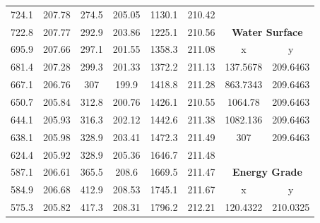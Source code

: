 \begin{center}
\begin{tabular}{|cccc||cc||cc|}
    724.1    & 207.78                   & 274.5 & 205.05                        & 1130.1 & 210.42                                &          &                                     \\
    722.8    & 207.77                   & 292.9 & 203.86                        & 1225.1 & 210.56                                & \multicolumn{2}{c|}{\textbf{Water Surface }}   \\ 
    \cline{7-8}
    695.9    & 207.66                   & 297.1 & 201.55                        & 1358.3 & 211.08                                & x        & y                                   \\
    681.4    & 207.28                   & 299.3 & 201.33                        & 1372.2 & 211.13                                & 137.5678 & 209.6463                            \\
    667.1    & 206.76                   & 307   & 199.9                         & 1418.8 & 211.28                                & 863.7343 & 209.6463                            \\
    650.7    & 205.84                   & 312.8 & 200.76                        & 1426.1 & 210.55                                & 1064.78  & 209.6463                            \\
    644.1    & 205.93                   & 316.3 & 202.12                        & 1442.6 & 211.38                                & 1082.136 & 209.6463                            \\
    638.1    & 205.98                   & 328.9 & 203.41                        & 1472.3 & 211.49                                & 307      & 209.6463                            \\
    624.4    & 205.92                   & 328.9 & 205.36                        & 1646.7 & 211.48                                &          &                                     \\
    587.1    & 206.61                   & 365.5 & 208.6                         & 1669.5 & 211.47                                & \multicolumn{2}{c|}{\textbf{Energy Grade }}    \\ 
    \cline{7-8}
    584.9    & 206.68                   & 412.9 & 208.53                        & 1745.1 & 211.67                                & x        & y                                   \\
    575.3    & 205.82                   & 417.3 & 208.31                        & 1796.2 & 212.21                                & 120.4322 & 210.0325                            \\

\end{tabular}
\end{center}
